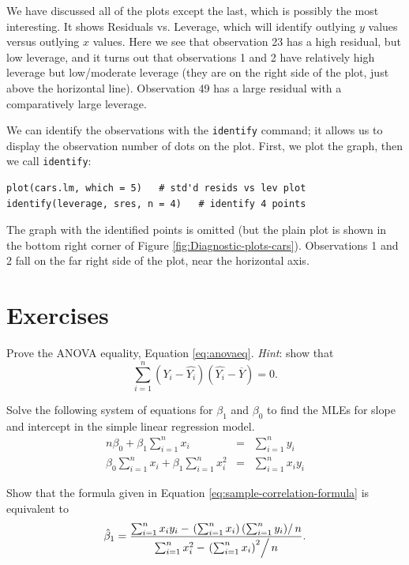 \documentclass[captions=tableheading]{scrbook}
\begin{document}
We have discussed all of the plots except the last, which is possibly the most interesting. It shows Residuals vs. Leverage, which will identify outlying \(y\) values versus outlying \(x\) values. Here we see that observation 23 has a high residual, but low leverage, and it turns out that observations 1 and 2 have relatively high leverage but low/moderate leverage (they are on the right side of the plot, just above the horizontal line). Observation 49 has a large residual with a comparatively large leverage. 

We can identify the observations with the \texttt{identify} command; it allows us to display the observation number of dots on the plot. First, we plot the graph, then we call \texttt{identify}:


\begin{verbatim}
plot(cars.lm, which = 5)   # std'd resids vs lev plot
identify(leverage, sres, n = 4)   # identify 4 points
\end{verbatim}

The graph with the identified points is omitted (but the plain plot is shown in the bottom right corner of Figure \ref{fig:Diagnostic-plots-cars}). Observations 1 and 2 fall on the far right side of the plot, near the horizontal axis.

\newpage{}
\section{Exercises}
\label{sec-11-6}

\setcounter{thm}{0}

\begin{xca}
Prove the ANOVA equality, Equation \ref{eq:anovaeq}. \emph{Hint}:
show that
\[
\sum_{i=1}^{n}(Y_{i}-\hat{Y_{i}})(\hat{Y_{i}}-\overline{Y})=0.
\]
\end{xca}

\begin{xca}
\label{xca:find-mles-SLR}
Solve the following system of equations for \(\beta_{1}\) and \(\beta_{0}\) to find the MLEs for slope and intercept in the simple linear regression model.
\begin{eqnarray*}
n\beta_{0}+\beta_{1}\sum_{i=1}^{n}x_{i} & = & \sum_{i=1}^{n}y_{i}\\
\beta_{0}\sum_{i=1}^{n}x_{i}+\beta_{1}\sum_{i=1}^{n}x_{i}^{2} & = & \sum_{i=1}^{n}x_{i}y_{i}
\end{eqnarray*}
\end{xca}

\begin{xca}
\label{xca:show-alternate-slope-formula}
Show that the formula given in Equation \ref{eq:sample-correlation-formula} is equivalent to
\[
\hat{\beta}_{1} = \frac{\sum_{i=1}^{n}x_{i}y_{i}-\left.\left(\sum_{i=1}^{n}x_{i}\right)\left(\sum_{i=1}^{n}y_{i}\right)\right\slash n}{\sum_{i=1}^{n}x_{i}^{2}-\left.\left(\sum_{i=1}^{n}x_{i}\right)^{2}\right\slash n}.
\]
\end{xca}
\end{document}
